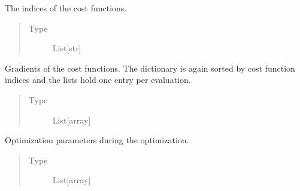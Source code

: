 \documentclass[letterpaper,10pt,english]{sphinxmanual}
\begin{document}
\begin{fulllineitems}
\begin{fulllineitems}
\end{fulllineitems}


\begin{fulllineitems}
\label{\detokenize{qsim:qsim.optimization_data.OptimizationSummary.indices}}
The indices of the cost functions.
\begin{quote}\begin{description}
\item[{Type}] \leavevmode
List{[}str{]}

\end{description}\end{quote}

\end{fulllineitems}


\begin{fulllineitems}
\label{\detokenize{qsim:qsim.optimization_data.OptimizationSummary.gradients}}
Gradients of the cost functions. The dictionary is again sorted by cost
function indices and the lists hold one entry per evaluation.
\begin{quote}\begin{description}
\item[{Type}] \leavevmode
List{[}array{]}

\end{description}\end{quote}

\end{fulllineitems}


\begin{fulllineitems}
\label{\detokenize{qsim:qsim.optimization_data.OptimizationSummary.parameters}}
Optimization parameters during the optimization.
\begin{quote}\begin{description}
\item[{Type}] \leavevmode
List{[}array{]}

\end{description}\end{quote}

\end{fulllineitems}


\end{fulllineitems}
\end{document}
